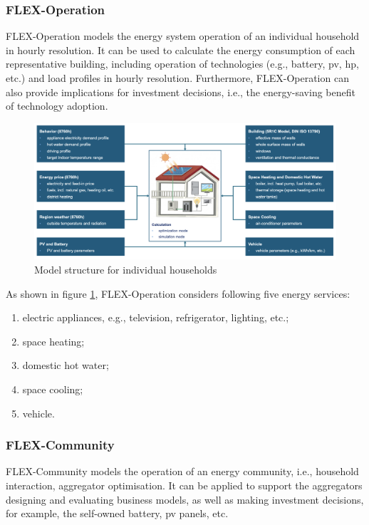 \subsubsection{FLEX-Operation}


FLEX-Operation models the energy system operation of an individual household in hourly resolution.  
It can be used to calculate the energy consumption of each representative building, including operation of technologies (e.g., battery, \gls{pv}, \gls{hp}, etc.) and load profiles in hourly resolution. 
Furthermore, FLEX-Operation can also provide implications for investment decisions, i.e., the energy-saving benefit of technology adoption. 

\begin{figure}[h]
  \centering
  \includegraphics[width=\textwidth]{Images/flex-operation.png}
  \caption{Model structure for individual households}
  \label{fig:flex-operation}
\end{figure}

As shown in figure \ref{fig:flex-operation}, FLEX-Operation considers following five energy services:

\begin{enumerate}
  \item electric appliances, e.g., television, refrigerator, lighting, etc.;
  \item space heating;
  \item domestic hot water;
  \item space cooling;
  \item vehicle. 
\end{enumerate}


\subsubsection{FLEX-Community}


FLEX-Community models the operation of an energy community, i.e., household interaction, aggregator optimisation. 
It can be applied to support the aggregators designing and evaluating business models, as well as making investment decisions, for example, the self-owned battery, \gls{pv} panels, etc.


